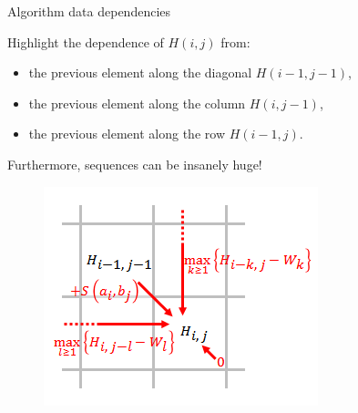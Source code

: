     \begin{frame}{Algorithm data dependencies}

        \begin{minipage}{0.49\linewidth}
            Highlight the dependence of $H(i, j)$ from:
        \begin{itemize}
            \item the previous element along the diagonal $H(i-1, j-1)$,
            \item the previous element along the column $H(i, j-1)$,
            \item the previous element along the row $H(i-1, j)$.
        \end{itemize}

        \vspace{10pt}

        Furthermore, sequences can be insanely huge!
        \end{minipage}
        \begin{minipage}{0.49\linewidth}
            \begin{figure}
            \centering
            \includegraphics[width=1\linewidth]{algorithm_image.png}
        \end{figure}
        \end{minipage}
        

        

    \end{frame}